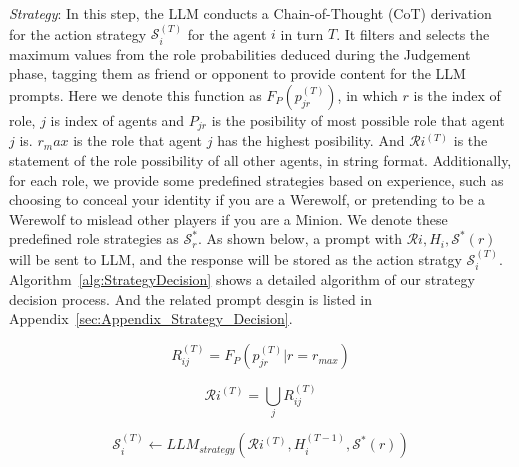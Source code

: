 \textit{Strategy}: In this step, the LLM conducts a Chain-of-Thought (CoT) derivation for the action strategy $ \mathcal{S} _{i}^{(T)} $ for the agent $ i $ in turn $ T $. It filters and selects the maximum values from the role probabilities deduced during the Judgement phase, tagging them as friend or opponent to provide content for the LLM prompts. Here we denote this function as $ F_P( p_{jr}^{(T)} ) $, in which $ r $ is the index of role, $ j $ is index of agents and $ P_{jr} $ is the posibility of most possible role that agent $ j $ is. $ r_max $ is the role that agent $ j $ has the highest posibility. And $ \mathcal{R} {i}^{(T)} $ is the statement of the role possibility of all other agents, in string format. Additionally, for each role, we provide some predefined strategies based on experience, such as choosing to conceal your identity if you are a Werewolf, or pretending to be a Werewolf to mislead other players if you are a Minion. We denote these predefined role strategies as $ \mathcal{S} ^*_r $. As shown below, a prompt with $ \mathcal{R} i,H_i,\mathcal{S} ^*(r) $ will be sent to LLM, and the response will be stored as the action stratgy $ \mathcal{S} _{i}^{(T)} $. Algorithm~\ref{alg:StrategyDecision} shows a detailed algorithm of our strategy decision process. And the related prompt desgin is listed in Appendix~\ref{sec:Appendix_Strategy_Decision}.

\begin{equation}
  R_{ij}^{(T)} = F_P(  p_{jr}^{(T)} | r = r_{max} )
  \label{eq:stratety_possibility_statement}
\end{equation}

\begin{equation}
  \mathcal{R} i^{(T)} = \bigcup_{j} R_{ij}^{(T)}
  \label{eq:stratety_possibility_statement_append}
\end{equation}

\begin{equation}
  \mathcal{S} _i^{(T)} \leftarrow LLM_{strategy}(\mathcal{R} i^{(T)},H_i^{(T-1)},\mathcal{S} ^*(r))
  \label{eq:strategy_LLM_strategy}
\end{equation}

